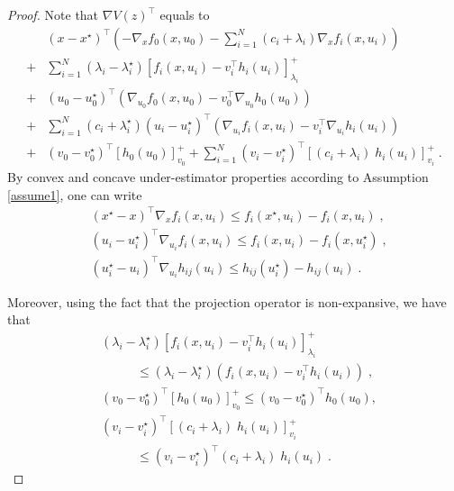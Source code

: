 \documentclass[journal,twoside,web]{ieeecolor}
\begin{document}
\begin{proof}
Note that $\nabla V(z)^\top$ equals to
\begin{align}
&(x-x^\star)^\top(-\nabla_x f_0(x,u_0)-  \sum_{i=1}^N(c_i+\lambda_i) \nabla_x f_i(x,u_i))\nonumber\\
+&\sum_{i=1}^N(\lambda_i-\lambda_{i}^\star) [f_i(x,u_i)-v_i^\top h_i(u_i)]_{\lambda_i}^+\nonumber\\
+&(u_0-u_0^\star)^\top (\nabla_{u_0} f_0(x,u_0)-v_{0}^\top \nabla_{u_0} h_{0}(u_0))\nonumber\\
+&\sum_{i=1}^N(c_i+\lambda_{i}^\star)(u_i-u_{i}^\star)^\top (\nabla_{u_i} f_i(x,u_i)-v_{i}^\top \nabla_{u_i} h_{i}(u_i))\nonumber\\
+& (v_0-v_0^\star)^\top [h_0(u_0)]_{v_0}^++ \sum_{i=1}^N (v_{i}-v_{{i}}^\star)^\top [(c_i+\lambda_i)\; h_{i}(u_i)]_{v_{i}}^+\;.
\end{align}
By convex and concave under-estimator properties according to Assumption \ref{assume1}, one can write \cite[Section~3.1.3]{boyd2004}
\begin{align}
&(x^\star-x)^\top \nabla_x f_i(x,u_i) \leq f_i(x^\star,u_i)-f_i(x,u_i)\;,\label{under_estimator_2}\\
&(u_i-u_i^\star)^\top \nabla_{u_i} f_i(x,u_i) \leq f_i(x,u_i)-f_i(x,u_i^\star)\;,\label{under_estimator_3}\\
&(u_i^\star-u_i)^\top \nabla_{u_i} h_{ij}(u_i) \leq h_{ij}(u_i^\star)-h_{ij}(u_i)\;.\label{under_estimator_4}
\end{align}

Moreover, using the fact that the projection operator is non-expansive, we have that
\begin{align}
&(\lambda_i-\lambda_{i}^\star) [f_i(x,u_i)-v_i^\top h_i(u_i)]_{\lambda_i}^+\nonumber\\
&\;\;\;\;\;\;\;\;\;\;\leq(\lambda_i-\lambda_{i}^\star) (f_i(x,u_i)-v_i^\top h_i(u_i))\;,\\
&(v_{0}-v_{{0}}^\star)^\top [ h_{0}(u_0)]_{v_{0}}^+
\leq(v_0-v_{{0}}^\star)^\top h_{0}(u_0),\\
&(v_{i}-v_{{i}}^\star)^\top [(c_i+\lambda_i)\; h_{i}(u_i)]_{v_{i}}^+\nonumber\\
&\;\;\;\;\;\;\;\;\;\;\leq(v_{i}-v_{{i}}^\star)^\top (c_i+\lambda_i)\; h_{i}(u_i)\;.
\end{align}


\end{proof}
\end{document}
